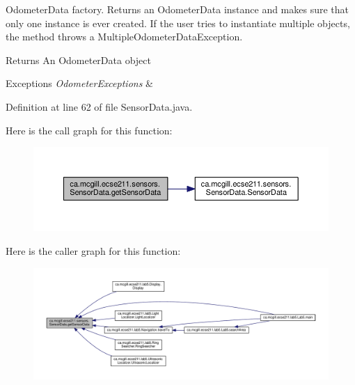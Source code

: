 Odometer\+Data factory. Returns an Odometer\+Data instance and makes sure that only one instance is ever created. If the user tries to instantiate multiple objects, the method throws a Multiple\+Odometer\+Data\+Exception.

\begin{DoxyReturn}{Returns}
An Odometer\+Data object 
\end{DoxyReturn}

\begin{DoxyExceptions}{Exceptions}
{\em Odometer\+Exceptions} & \\
\hline
\end{DoxyExceptions}


Definition at line 62 of file Sensor\+Data.\+java.

Here is the call graph for this function\+:
\nopagebreak
\begin{figure}[H]
\begin{center}
\leavevmode
\includegraphics[width=350pt]{classca_1_1mcgill_1_1ecse211_1_1sensors_1_1_sensor_data_ab8aef4bdb5d9f3dad399656e00af2539_cgraph}
\end{center}
\end{figure}
Here is the caller graph for this function\+:
\nopagebreak
\begin{figure}[H]
\begin{center}
\leavevmode
\includegraphics[width=350pt]{classca_1_1mcgill_1_1ecse211_1_1sensors_1_1_sensor_data_ab8aef4bdb5d9f3dad399656e00af2539_icgraph}
\end{center}
\end{figure}
\mbox{\label{classca_1_1mcgill_1_1ecse211_1_1sensors_1_1_sensor_data_ae20bf127c57dcfcb3b7632ca05b6d482}} 
